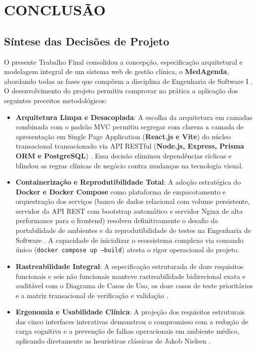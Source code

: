 \section{CONCLUSÃO}

\subsection{Síntese das Decisões de Projeto}

O presente Trabalho Final consolidou a concepção, especificação arquitetural e modelagem integral de um sistema web de gestão clínica, o \textbf{MedAgenda}, abordando todas as fases que compõem a disciplina de Engenharia de Software I \cite{sommerville2011}. O desenvolvimento do projeto permitiu comprovar na prática a aplicação dos seguintes preceitos metodológicos:
\begin{itemize}
    \item \textbf{Arquitetura Limpa e Desacoplada}: A escolha da arquitetura em camadas combinada com o padrão MVC permitiu segregar com clareza a camada de apresentação em Single Page Application (\textbf{React.js e Vite}) do núcleo transacional transacionado via API RESTful (\textbf{Node.js, Express, Prisma ORM e PostgreSQL}) \cite{martin2019, fowler2002}. Essa decisão eliminou dependências cíclicas e blindou as regras clínicas de negócio contra mudanças na tecnologia visual.
    \item \textbf{Containerização e Reprodutibilidade Total}: A adoção estratégica do \textbf{Docker e Docker Compose} como plataforma de empacotamento e orquestração dos serviços (banco de dados relacional com volume persistente, servidor da API REST com bootstrap automático e servidor Nginx de alta performance para o frontend) resolveu definitivamente o desafio da portabilidade de ambientes e da reprodutibilidade de testes na Engenharia de Software \cite{docker2023, burns2018}. A capacidade de inicializar o ecossistema complexo via comando único (\texttt{docker compose up --build}) atesta o rigor operacional do projeto.
    \item \textbf{Rastreabilidade Integral}: A especificação estruturada de doze requisitos funcionais e seis não funcionais manteve rastreabilidade bidirecional exata e auditável com o Diagrama de Casos de Uso, os doze casos de teste prioritários e a matriz transacional de verificação e validação \cite{myers2011}.
    \item \textbf{Ergonomia e Usabilidade Clínica}: A projeção dos requisitos estruturais das cinco interfaces interativas demonstrou o compromisso com a redução de carga cognitiva e a prevenção de falhas operacionais em ambiente médico, aplicando diretamente as heurísticas clássicas de Jakob Nielsen \cite{nielsen1993, norman2013}.
\end{itemize}

